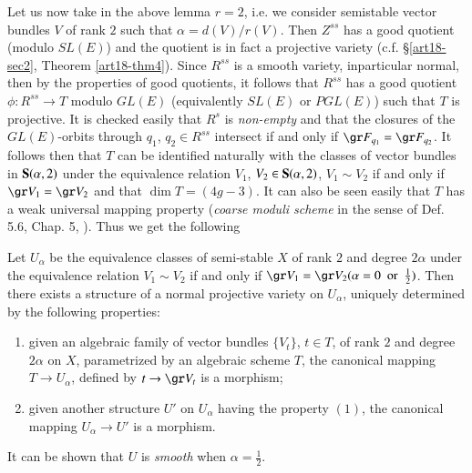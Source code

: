 Let us now take in the above lemma $r=2$, i.e. we consider semistable vector bundles $V$ of rank $2$ such that $\alpha=d(V)/r(V)$. Then $Z^{ss}$ has a good quotient (modulo $SL(E)$) and the quotient is in fact a projective variety (c.f. \S\ref{art18-sec2}, Theorem \ref{art18-thm4}). Since $R^{ss}$ is a smooth variety, in\pageoriginale particular normal, then by the properties of good quotients, it follows that $R^{ss}$ has a good quotient $\phi:R^{ss}\to T$ modulo $GL(E)$ (equivalently $SL(E)$ or $PGL(E)$) such that $T$ is projective. It is checked easily that $R^{s}$ is {\em non-empty} and that the closures of the $GL(E)$-orbits through $q_{1}$, $q_{2}\in R^{ss}$ intersect if and only if $\gr F_{q_{1}}=\gr F_{q_{2}}$. It follows then that $T$ can be identified naturally with the classes of vector bundles in $\mathbf{S}(\alpha,2)$ under the equivalence relation $V_{1}$, $V_{2}\in \mathbf{S}(\alpha,2)$, $V_{1}\sim V_{2}$ if and only if $\gr V_{1}=\gr V_{2}$ and that $\dim T=(4g-3)$. It can also be seen easily that $T$ has a weak universal mapping property ({\em coarse moduli scheme} in the sense of Def. 5.6, Chap. 5, \cite{art18-key4}). Thus we get the following

\begin{theorem}\label{art18-thm5}
Let $U_{\alpha}$ be the equivalence classes of semi-stable $X$ of rank $2$ and degree $2\alpha$ under the equivalence relation $V_{1}\sim V_{2}$ if and only if $\gr V_{1}=\gr V_{2}(\alpha=0\text{~ or~ }\frac{1}{2})$. Then there exists a structure of a normal projective variety on $U_{\alpha}$, uniquely determined by the following properties:
\begin{enumerate}
\renewcommand{\labelenumi}{\rm(\theenumi)}
\item given an algebraic family of vector bundles $\{V_{t}\}$, $t\in T$, of rank $2$ and degree $2\alpha$ on $X$, parametrized by an algebraic scheme $T$, the canonical mapping $T\to U_{\alpha}$, defined by $t\to \gr V_{t}$ is a morphism;

\item given another structure $U'$ on $U_{\alpha}$ having the property $(1)$, the canonical mapping $U_{\alpha}\to U'$ is a morphism.
\end{enumerate}
\end{theorem}

\begin{remark*}
It can be shown that $U$ is {\em smooth} when $\alpha=\frac{1}{2}$.
\end{remark*}

